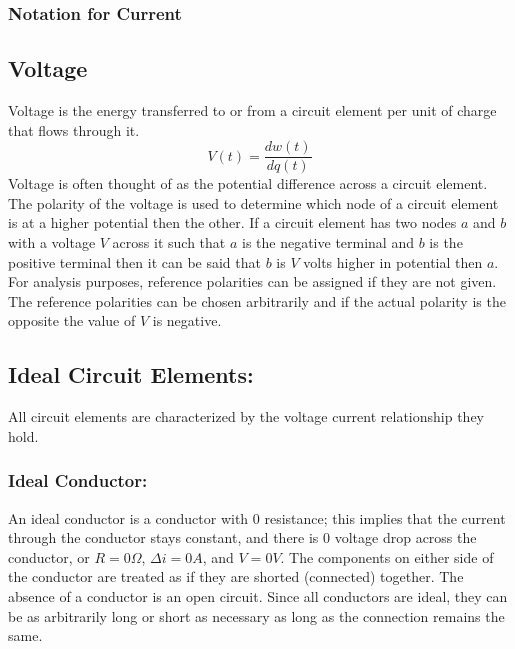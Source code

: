 \documentclass[14pt]{article}
\begin{document}
    \subsubsection{Notation for Current}
    \subsection{Voltage}
    Voltage is the energy transferred to or from a circuit element per
    unit of charge that flows through it. 
    $$V(t)=\frac{dw(t)}{dq(t)}$$ Voltage is often thought of as the
    potential difference across a circuit element. The polarity of the
    voltage is used to determine which node of a circuit element is at a
    higher potential then the other. If a circuit element has two nodes
    $a$ and $b$ with a voltage $V$ across it such that $a$ is the
    negative terminal and $b$ is the positive terminal then it can be
    said that $b$ is $V$ volts higher in potential then $a$. For
    analysis purposes, reference polarities can be assigned if they are
    not given. The reference polarities can be chosen arbitrarily and if
    the actual polarity is the opposite the value of $V$ is negative. 
    \subsection{Ideal Circuit Elements:}
    All circuit elements are characterized by the voltage current
    relationship they hold.
    \subsubsection{Ideal Conductor:}
    An ideal conductor is a conductor with $0$ resistance; this implies
    that the current through the conductor stays constant, and there is
    $0$ voltage drop across the conductor, or $R=0\Omega$, $\Delta
    i=0A$, and $V=0V$. The components on either side of the conductor
    are treated as if they are shorted (connected) together. The absence
    of a conductor is an open circuit. Since all conductors are ideal,
    they can be as arbitrarily long or short as necessary as long as the
    connection remains the same. 
\end{document}
